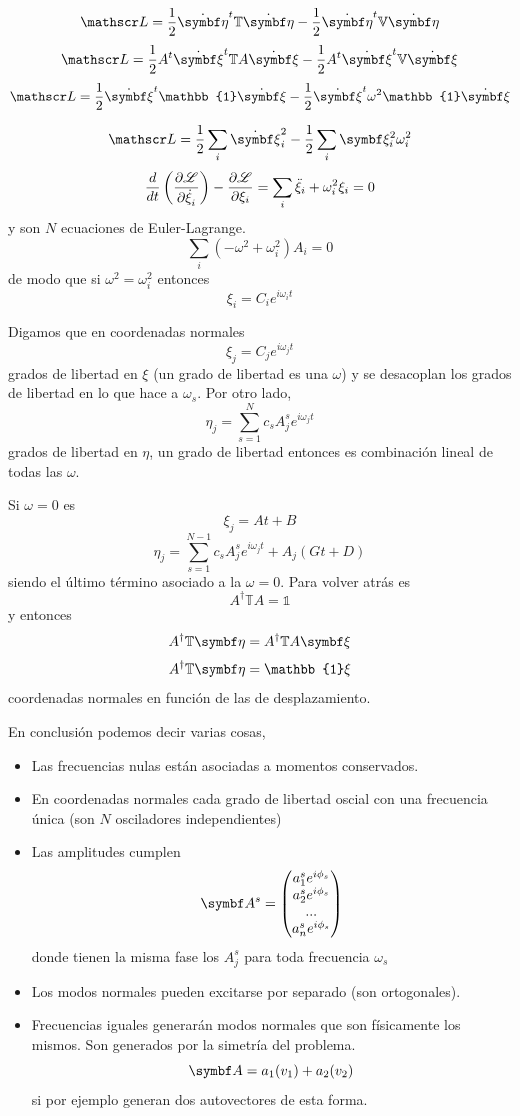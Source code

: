 \documentclass[10pt,oneside]{CBFT_book}
\begin{document}
\[
	\Lag = \frac{1}{2} \dot{\vb{\eta}}^t \mathbb{T} \dot{\vb{\eta}} - \frac{1}{2} \dot{\vb{\eta}}^t \mathbb{V} \dot{\vb{\eta}}
\]
\[
	\Lag = \frac{1}{2} A^t\dot{\vb{\xi}}^t \mathbb{T} A \dot{\vb{\xi}} - \frac{1}{2} A^t\dot{\vb{\xi}}^t \mathbb{V} 
\dot{\vb{\xi}}
\]
\[
	\Lag = \frac{1}{2} \dot{\vb{\xi}}^t \mathbb{1} \dot{\vb{\xi}} - \frac{1}{2} \dot{\vb{\xi}}^t \omega^2 \mathbb{1} \dot{\vb{\xi}}
\]

\[
	\Lag = \frac{1}{2} \sum_i \dot{\vb{\xi}}_i^2 - \frac{1}{2} \sum_i \vb{\xi}_i^2 \omega^2_i 
\]
\[
	\frac{d}{dt}\left( \frac{\partial^{\hspace{-0.05em}} {\mathscr{L}}}{\partial {\dot{\xi}_i}^{\hspace{-0.05em}}} \right)- \frac{\partial^{\hspace{-0.05em}} {\mathscr{L}}}{\partial {\xi_i}^{\hspace{-0.05em}}} = \sum_i \ddot{\xi}_i + \omega^2_i \xi_i = 0 
\]
y son $N$ ecuaciones de Euler-Lagrange.
\[
	\sum_i ( -\omega^2 + \omega^2_i ) A_i = 0
\]
de modo que si $\omega^2 = \omega^2_i$ entonces
\[
	\xi_i = C_i e^{i\omega_i t}
\]

Digamos que en coordenadas normales
\[
	\xi_j = C_j e^{i \omega_j t}
\]
grados de libertad en $\xi$ (un grado de libertad es una $\omega$) y se desacoplan los grados de libertad
en lo que hace a $\omega_s$.
Por otro lado,
\[
	\eta_j = \sum_{s=1}^N c_s A_j^s e^{i \omega_j t}
\]
grados de libertad en $\eta$, un grado de libertad entonces es combinación lineal de todas las $\omega$.

Si $\omega=0$ es 
\[
	\xi_j = At + B 
\]
\[
	\eta_j = \sum_{s=1}^{N-1} c_s A_j^s e^{i \omega_j t} + A_j(Gt + D)
\]
siendo el último término asociado a la $\omega=0$.
Para volver atrás es 
\[
	A^{\dagger} \mathbb{T} A = \mathbb{1}
\]
y entonces 
\[
	A^{\dagger} \mathbb{T} \vb{\eta} = A^{\dagger} \mathbb{T} A \vb{\xi}  
\]
\[
	A^{\dagger} \mathbb{T} \vb{\eta} = \mathbb{1} \xi
\]
coordenadas normales en función de las de desplazamiento.

En conclusión podemos decir varias cosas,
\begin{itemize}
 \item Las frecuencias nulas están asociadas a momentos conservados.
 \item En coordenadas normales cada grado de libertad oscial con una frecuencia única (son $N$
	osciladores independientes)
 \item Las amplitudes cumplen
 \[ \vb{A}^s =
 \begin{pmatrix}
  a_1^s e^{i \phi_s} \\
  a_2^s e^{i \phi_s} \\
  ... \\
  a_n^s e^{i \phi_s}
 \end{pmatrix}
 \]
 donde tienen la misma fase los $A_j^s$ para toda frecuencia $\omega_s$
 \item Los modos normales pueden excitarse por separado (son ortogonales).
 \item Frecuencias iguales generarán modos normales que son físicamente los
 mismos. Son generados por la simetría del problema.
 \[
	\vb{A} = a_1(v_1) + a_2(v_2)
 \]
 si por ejemplo generan dos autovectores de esta forma.
\end{itemize}
\end{document}
